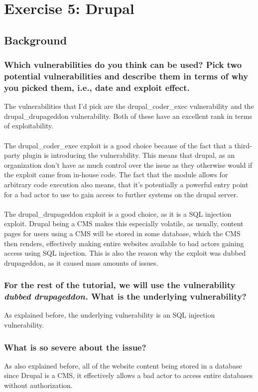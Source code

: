 \section{Exercise 5: Drupal}
\subsection{Background}
\subsubsection{Which vulnerabilities do you think can be used? Pick two potential vulnerabilities and describe them in terms of why you picked them, i.e., date and exploit effect.}
The vulnerabilities that I'd pick are the drupal\_coder\_exec vulnerability and the drupal\_drupageddon vulnerability. Both of these have an excellent rank in terms of exploitability.
\\\\
The drupal\_coder\_exec exploit is a good choice because of the fact that a third-party plugin is introducing the vulnerability. This means that drupal, as an organization don't have as much control over the issue as they otherwise would if the exploit came from in-house code. The fact that the module allows for arbitrary code execution also means, that it's potentially a powerful entry point for a bad actor to use to gain access to further systems on the drupal server.
\\\\
The drupal\_drupageddon exploit is a good choice, as it is a SQL injection exploit. Drupal being a CMS makes this especially volatile, as usually, content pages for users using a CMS will be stored in some database, which the CMS then renders, effectively making entire websites available to bad actors gaining access using SQL injection. This is also the reason why the exploit was dubbed drupageddon, as it caused mass amounts of issues.
\subsubsection{For the rest of the tutorial, we will use the vulnerability \textit{dubbed drupageddon.} What is the underlying vulnerability?}
As explained before, the underlying vulnerability is an SQL injection vulnerability.

\subsubsection{What is so severe about the issue?}
As also explained before, all of the website content being stored in a database since Drupal is a CMS, it effectively allows a bad actor to access entire databases without authorization.

